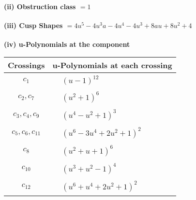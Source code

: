 \documentclass[1p]{elsarticle_modified}
\theoremstyle{definition}
\begin{document}
\flushleft \textbf{(ii) Obstruction class $= 1$}\\~\\
\flushleft \textbf{(iii) Cusp Shapes $= 4 u^5-4 u^3 a-4 u^4-4 u^3+8 a u+8 u^2+4$}\\~\\
\newpage\renewcommand{\arraystretch}{1}
\flushleft \textbf{(iv) u-Polynomials at the component}\newline \\
\begin{tabular}{m{50pt}|m{274pt}}
Crossings & \hspace{64pt}u-Polynomials at each crossing \\
\hline $$\begin{aligned}c_{1}\end{aligned}$$&$\begin{aligned}
&(u-1)^{12}
\end{aligned}$\\
\hline $$\begin{aligned}c_{2},c_{7}\end{aligned}$$&$\begin{aligned}
&(u^2+1)^6
\end{aligned}$\\
\hline $$\begin{aligned}c_{3},c_{4},c_{9}\end{aligned}$$&$\begin{aligned}
&(u^4- u^2+1)^3
\end{aligned}$\\
\hline $$\begin{aligned}c_{5},c_{6},c_{11}\end{aligned}$$&$\begin{aligned}
&(u^6-3 u^4+2 u^2+1)^2
\end{aligned}$\\
\hline $$\begin{aligned}c_{8}\end{aligned}$$&$\begin{aligned}
&(u^2+u+1)^6
\end{aligned}$\\
\hline $$\begin{aligned}c_{10}\end{aligned}$$&$\begin{aligned}
&(u^3+u^2-1)^4
\end{aligned}$\\
\hline $$\begin{aligned}c_{12}\end{aligned}$$&$\begin{aligned}
&(u^6+u^4+2 u^2+1)^2
\end{aligned}$\\
\hline
\end{tabular}\\~\\
\end{document}

